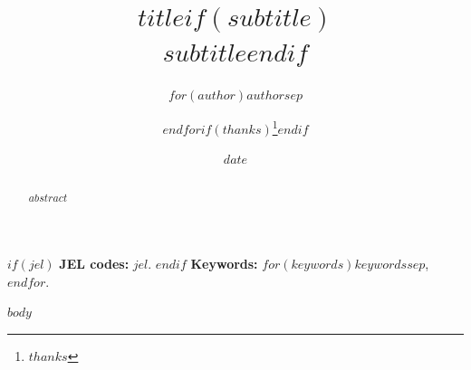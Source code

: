 \documentclass[11pt,a4paper]{article}
\title{$title$$if(subtitle)$\\[0.3em]
\large $subtitle$$endif$}
\author{$for(author)$$author$$sep$ \and $endfor$$if(thanks)$\thanks{$thanks$}$endif$}
\date{$date$}
\begin{document}
\maketitle

\begin{abstract}
$abstract$
\end{abstract}

$if(jel)$
\noindent\textbf{JEL codes:} $jel$.\quad
$endif$
\textbf{Keywords:} $for(keywords)$$keywords$$sep$, $endfor$.

$body$
\end{document}
